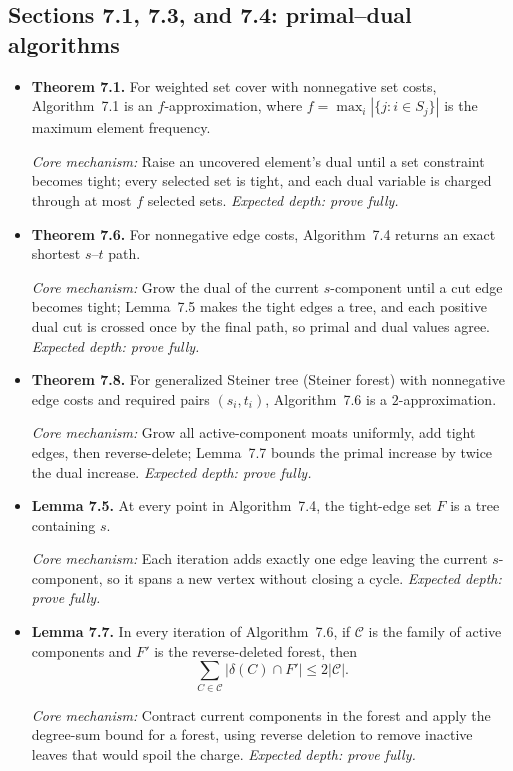 \documentclass[11pt,a4paper]{article}
\newcommand{\1}{\mathbf 1}
\newcommand{\catalogue}[4]{%
  \item \textbf{#1.} #2\par
  {\footnotesize\emph{Core mechanism:} #3
  \emph{Expected depth: #4.}}}
\begin{document}
\subsection*{Sections 7.1, 7.3, and 7.4: primal--dual algorithms}
\begin{itemize}
\catalogue{Theorem 7.1}{For weighted set cover with nonnegative set costs,
Algorithm~7.1 is an $f$-approximation, where
$f=\max_i|\{j:i\in S_j\}|$ is the maximum element frequency.}{Raise an
uncovered element's dual until a set constraint becomes tight; every selected
set is tight, and each dual variable is charged through at most $f$ selected
sets.}{prove fully}

\catalogue{Theorem 7.6}{For nonnegative edge costs, Algorithm~7.4 returns an
exact shortest $s$--$t$ path.}{Grow the dual of the current $s$-component
until a cut edge becomes tight; Lemma~7.5 makes the tight edges a tree, and
each positive dual cut is crossed once by the final path, so primal and dual
values agree.}{prove fully}

\catalogue{Theorem 7.8}{For generalized Steiner tree (Steiner forest) with
nonnegative edge costs and required pairs $(s_i,t_i)$, Algorithm~7.6 is a
$2$-approximation.}{Grow all active-component moats uniformly, add tight
edges, then reverse-delete; Lemma~7.7 bounds the primal increase by twice the
dual increase.}{prove fully}

\catalogue{Lemma 7.5}{At every point in Algorithm~7.4, the tight-edge set
$F$ is a tree containing $s$.}{Each iteration adds exactly one edge leaving
the current $s$-component, so it spans a new vertex without closing a cycle.}
{prove fully}

\catalogue{Lemma 7.7}{In every iteration of Algorithm~7.6, if $\mathcal C$ is
the family of active components and $F'$ is the reverse-deleted forest, then
\[
\sum_{C\in\mathcal C}|\delta(C)\cap F'|\leq2|\mathcal C|.
\]}
{Contract current components in the forest and apply the degree-sum bound for
a forest, using reverse deletion to remove inactive leaves that would spoil
the charge.}{prove fully}
\end{itemize}
\end{document}
